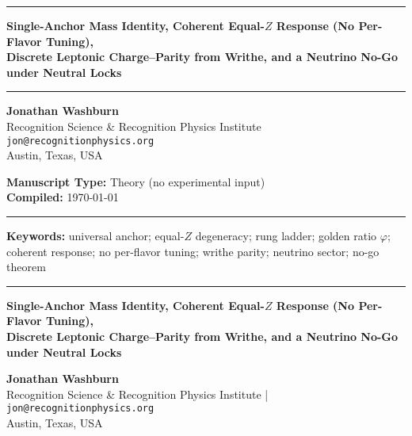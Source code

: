 \documentclass[11pt]{article}
\newcommand{\Hrule}{\vspace{0.8em}\hrule\vspace{0.8em}}
\begin{document}
\begin{titlepage}
  \centering

  \Hrule
  {\LARGE \bfseries Single-Anchor Mass Identity, Coherent Equal-$Z$ Response (No Per-Flavor Tuning),\\
  Discrete Leptonic Charge--Parity from Writhe, and a Neutrino No-Go under Neutral Locks\par}
  \Hrule

  \vspace{1.25em}
  {\large \textbf{Jonathan Washburn}}\\
  {\large Recognition Science \& Recognition Physics Institute}\\
  {\large \texttt{jon@recognitionphysics.org}}\\
  {\large Austin, Texas, USA}

  \vfill

  {\large \textbf{Manuscript Type:} Theory (no experimental input)}\\
  {\large \textbf{Compiled:} \today}

  \vspace{1.25em}
  \Hrule
  \vspace{0.5em}
  {\normalsize
  \textbf{Keywords:} universal anchor; equal-$Z$ degeneracy; rung ladder; golden ratio $\varphi$;\\
  coherent response; no per-flavor tuning; writhe parity; neutrino sector; no-go theorem
  }
  \vspace{0.3em}
  \Hrule

\end{titlepage}

\begin{center}
  {\Large \bfseries Single-Anchor Mass Identity, Coherent Equal-$Z$ Response (No Per-Flavor Tuning),\\
  Discrete Leptonic Charge--Parity from Writhe, and a Neutrino No-Go under Neutral Locks\par}
  \vspace{0.75em}

  {\normalsize \textbf{Jonathan Washburn}\\
  Recognition Science \& Recognition Physics Institute \quad|\quad
  \texttt{jon@recognitionphysics.org}\\
  Austin, Texas, USA}
\end{center}
\end{document}
